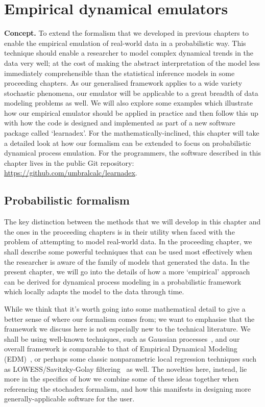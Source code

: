 \chapter{\sffamily Empirical dynamical emulators}

{\bfseries\sffamily Concept.} To extend the formalism that we developed in previous chapters to enable the empirical emulation of real-world data in a probabilistic way. This technique should enable a researcher to model complex dynamical trends in the data very well; at the cost of making the abstract interpretation of the model less immediately comprehensible than the statistical inference models in some proceeding chapters. As our generalised framework applies to a wide variety stochastic phenomena, our emulator will be applicable to a great breadth of data modeling problems as well. We will also explore some examples which illustrate how our empirical emulator should be applied in practice and then follow this up with how the code is designed and implemented as part of a new software package called `learnadex'. For the mathematically-inclined, this chapter will take a detailed look at how our formalism can be extended to focus on probabilistic dynamical process emulation. For the programmers, the software described in this chapter lives in the public Git repository: \href{https://github.com/umbralcalc/learnadex}{https://github.com/umbralcalc/learnadex}.

\section{\sffamily Probabilistic formalism}

The key distinction between the methods that we will develop in this chapter and the ones in the proceeding chapters is in their utility when faced with the problem of attempting to model real-world data. In the proceeding chapter, we shall describe some powerful techniques that can be used most effectively when the researcher is aware of the family of models that generated the data. In the present chapter, we will go into the details of how a more `empirical' approach can be derived for dynamical process modeling in a probabilistic framework which locally adapts the model to the data through time. 

While we think that it's worth going into some mathematical detail to give a better sense of where our formalism comes from; we want to emphasise that the framework we discuss here is not especially new to the technical literature. We shall be using  well-known techniques, such as Gaussian processes~\cite{murphy2012machine}, and our overall framework is comparable to that of Empirical Dynamical Modeling (EDM)~\cite{sugihara1990nonlinear}, or perhaps some classic nonparametric local regression techniques such as LOWESS/Savitzky-Golay filtering~\cite{savitzky1964smoothing} as well. The novelties here, instead, lie more in the specifics of how we combine some of these ideas together when referencing the stochadex formalism, and how this manifests in designing more generally-applicable software for the user.


